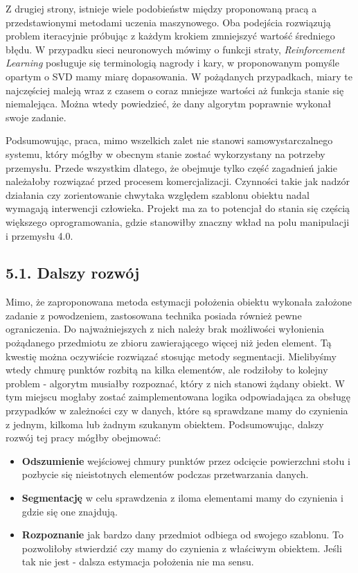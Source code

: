 \documentclass{article}
\begin{document}
Z drugiej strony, istnieje wiele podobieństw między proponowaną pracą a przedstawionymi metodami uczenia maszynowego. Oba podejścia rozwiązują problem iteracyjnie próbując z każdym krokiem zmniejszyć wartość średniego błędu. W przypadku sieci neuronowych mówimy o funkcji straty, \emph{Reinforcement Learning} posługuje się terminologią nagrody i kary, w proponowanym pomyśle opartym o SVD mamy miarę dopasowania. W pożądanych przypadkach, miary te najczęściej maleją wraz z czasem o coraz mniejsze wartości aż funkcja stanie się niemalejąca. Można wtedy powiedzieć, że dany algorytm poprawnie wykonał swoje zadanie.

Podsumowując, praca, mimo wszelkich zalet nie stanowi samowystarczalnego systemu, który mógłby w obecnym stanie zostać wykorzystany na potrzeby przemysłu. Przede wszystkim dlatego, że obejmuje tylko część zagadnień jakie należałoby rozwiązać przed procesem komercjalizacji. Czynności takie jak nadzór działania czy zorientowanie chwytaka względem szablonu obiektu nadal wymagają interwencji człowieka. Projekt ma za to potencjał do stania się częścią większego oprogramowania, gdzie stanowiłby znaczny wkład na polu manipulacji i przemysłu 4.0.

\subsection*{\LARGE{5.1. Dalszy rozwój}} 

Mimo, że zaproponowana metoda estymacji położenia obiektu wykonała założone zadanie z powodzeniem, zastosowana technika posiada również pewne ograniczenia. Do najważniejszych z nich należy brak możliwości wyłonienia pożądanego przedmiotu ze zbioru zawierającego więcej niż jeden element. Tą kwestię można oczywiście rozwiązać stosując metody segmentacji. Mielibyśmy wtedy chmurę punktów rozbitą na kilka elementów, ale rodziłoby to kolejny problem - algorytm musiałby rozpoznać, który z nich stanowi żądany obiekt. W tym miejscu mogłaby zostać zaimplementowana logika odpowiadająca za obsługę przypadków w zależności czy w danych, które są sprawdzane mamy do czynienia z jednym, kilkoma lub żadnym szukanym obiektem. Podsumowując, dalszy rozwój tej pracy mógłby obejmować:

\begin{itemize}
\item \textbf{Odszumienie} wejściowej chmury punktów przez odcięcie powierzchni stołu i pozbycie się nieistotnych elementów podczas przetwarzania danych.

\item \textbf{Segmentację} w celu sprawdzenia z iloma elementami mamy do czynienia i gdzie się one znajdują.

\item \textbf{Rozpoznanie} jak bardzo dany przedmiot odbiega od swojego szablonu. To pozwoliłoby stwierdzić czy mamy do czynienia z właściwym obiektem. Jeśli tak nie jest - dalsza estymacja położenia nie ma sensu.
\end{itemize}
\end{document}
